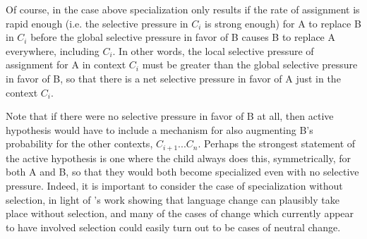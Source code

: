 Of course, in the case above specialization only results if the rate of assignment is rapid enough (i.e. the selective pressure in $C_i$ is strong enough) for A to replace B in $C_i$ before the global selective pressure in favor of B causes B to replace A everywhere, including $C_i$.
In other words, the local selective pressure of assignment for A in context $C_i$ must be greater than the global selective pressure in favor of B, so that there is a net selective pressure in favor of A just in the context $C_i$.

Note that if there were no selective pressure in favor of B at all, then active hypothesis would have to include a mechanism for also augmenting B's probability for the other contexts, $C_{i+1}$...$C_n$.
Perhaps the strongest statement of the active hypothesis is one where the child always does this, symmetrically, for both A and B, so that they would both become specialized even with no selective pressure.
Indeed, it is important to consider the case of specialization without selection, in light of \citet{kauhanen2016}'s work showing that language change can plausibly take place without selection, and many of the cases of change which currently appear to have involved selection could easily turn out to be cases of neutral change.




